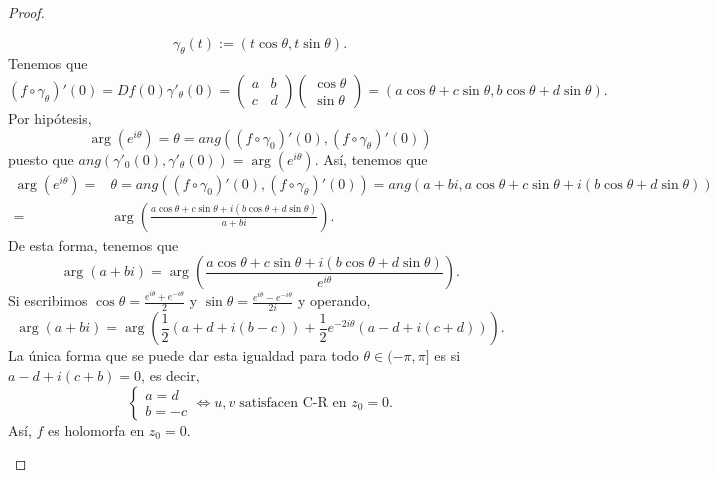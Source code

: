 \begin{proof}
\begin{description}
	\[\gamma_{\theta }\left(t\right):=\left(t\cos\theta, t\sin\theta\right) .\]
	Tenemos que 
	\[\left(f\circ\gamma_{\theta }\right)'\left(0\right)= Df\left(0\right)\gamma'_{\theta }\left(0\right)=\begin{pmatrix} a & b \\ c & d \end{pmatrix}\begin{pmatrix} \cos \theta \\ \sin \theta \end{pmatrix}=\left(a \cos \theta + c \sin \theta, b \cos \theta + d \sin \theta \right) .\]
	Por hipótesis,
	\[\arg\left(e^{i\theta }\right)=\theta = ang\left(\left(f\circ \gamma_{0 }\right)'\left(0\right), \left(f\circ\gamma_{\theta }\right)'\left(0\right)\right) \]
puesto que $\displaystyle ang\left(\gamma'_{0}\left(0\right), \gamma'_{\theta}\left(0\right)\right)=\arg\left(e^{i\theta }\right) $. Así, tenemos que 
\[
\begin{split}
	\arg\left(e^{i\theta }\right)= &\theta = ang\left(\left(f\circ \gamma_{0 }\right)'\left(0\right), \left(f\circ\gamma_{\theta }\right)'\left(0\right)\right) = ang\left(a + bi, a\cos\theta + c \sin \theta + i \left(b\cos \theta + d \sin \theta \right)\right)\\
	= & \arg\left(\frac{a \cos\theta + c \sin \theta + i \left(b \cos\theta+ d \sin\theta\right)}{a + bi}\right).
\end{split}
\]
De esta forma, tenemos que 
\[\arg\left(a + bi\right)=\arg\left(\frac{a \cos\theta + c \sin \theta + i\left(b \cos\theta + d \sin\theta \right)}{e^{i\theta }}\right)  .\]
Si escribimos $\displaystyle \cos\theta = \frac{e^{i\theta }+ e^{-i\theta }}{2} $ y $\displaystyle \sin\theta = \frac{e^{i\theta}-e^{-i\theta}}{2i} $ y operando,
\[\arg\left(a + bi\right)=\arg\left(\frac{1}{2}\left(a + d + i\left(b-c\right)\right) + \frac{1}{2}e^{-2i\theta }\left(a - d+i\left(c + d\right)\right)\right) .\]
La única forma que se puede dar esta igualdad para todo $\displaystyle \theta \in (-\pi, \pi] $ es si $\displaystyle a - d + i\left(c + b\right)=0 $, es decir,
\[
\begin{cases}
a = d \\
b =-c
\end{cases}
\iff u,v \; \text{satisfacen C-R en }z_{0}=0
.\]
Así, $\displaystyle f $ es holomorfa en $\displaystyle z_{0}=0 $. 
\end{description}
\end{proof}
